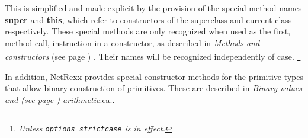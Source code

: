 This is simplified and made explicit by the provision of the special
method names \textbf{super} and \textbf{this}, which refer to
constructors of the superclass and current class respectively.  These
special methods are only recognized when used as the first, method call,
instruction in a constructor, as described in
 \emph{Methods and constructors} (see page \pageref{refmethcon}) .
Their names will be recognized independently of case.
\footnote{
\emph{Unless \texttt{options strictcase} is in effect.
}
}
 
In addition, NetRexx provides special constructor methods for the
primitive types that allow binary construction of primitives.
These are described in  \emph{Binary values and (see page \pageref{refbincon}) 
arithmetic}:ea..
